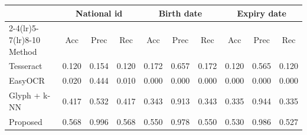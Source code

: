 \begin{tabular}{lccccccccc}
\toprule
 & \multicolumn{3}{c}{National id} & \multicolumn{3}{c}{Birth date} & \multicolumn{3}{c}{Expiry date}\\
\cmidrule(lr){2-4}\cmidrule(lr){5-7}\cmidrule(lr){8-10}
Method & Acc & Prec & Rec & Acc & Prec & Rec & Acc & Prec & Rec\\
\midrule
Tesseract & 0.120 & 0.154 & 0.120 & 0.172 & 0.657 & 0.172 & 0.120 & 0.565 & 0.120 \\
EasyOCR & 0.020 & 0.444 & 0.010 & 0.000 & 0.000 & 0.000 & 0.000 & 0.000 & 0.000 \\
Glyph + k-NN & 0.417 & 0.532 & 0.417 & 0.343 & 0.913 & 0.343 & 0.335 & 0.944 & 0.335 \\
Proposed & 0.568 & 0.996 & 0.568 & 0.550 & 0.978 & 0.550 & 0.530 & 0.986 & 0.527 \\
\bottomrule
\end{tabular}

